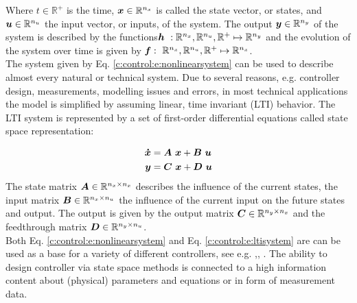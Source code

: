 Where $t \in \mathbb{R}^+$ is the time, $\mbox{\boldmath$x$} \in \mathbb{R}^{n_x}$ is called the state vector, or states, and $\mbox{\boldmath$u$} \in \mathbb{R}^{n_u}$ the input vector, or inputs, of the system. The output $\mbox{\boldmath$y$} \in \mathbb{R}^{n_y}$ of the system is described by the functions$\mbox{\boldmath$h$}~:\mathbb{R}^{n_x},\mathbb{R}^{n_u},\mathbb{R}^+ \mapsto \mathbb{R}^{n_y}$ and the evolution of the system over time is given by $\mbox{\boldmath$f$}:~\mathbb{R}^{n_x},\mathbb{R}^{n_u},\mathbb{R}^+ \mapsto \mathbb{R}^{n_x} $.\\

The system given by Eq. \ref{c:control:e:nonlinearsystem} can be used to describe almost every natural or technical system.\newline
Due to several reasons, e.g. controller design, measurements, modelling issues and errors, in most technical applications the model is simplified by assuming linear, time invariant (LTI) behavior. The LTI system is represented by a set of first-order differential equations \cite{Lunze2014} called state space representation:

\begin{align}
\begin{split}
\mbox{\boldmath$\dot{x}$} &= \mbox{\boldmath$A$}~\mbox{\boldmath$x$} + \mbox{\boldmath$B$}~\mbox{\boldmath$u$} \\
\mbox{\boldmath$y$} &= \mbox{\boldmath$C$}~\mbox{\boldmath$x$} + \mbox{\boldmath$D$}~\mbox{\boldmath$u$}
\end{split}
\label{c:control:e:ltisystem}
\end{align}
The state matrix $\mbox{\boldmath$A$} \in \mathbb{R}^{n_x\times n_x}$ describes the influence of the current states, the input matrix $\mbox{\boldmath$B$} \in \mathbb{R}^{n_x\times n_u}$ the influence of the current input on the future states and output. The output is given by the output matrix $\mbox{\boldmath$C$} \in \mathbb{R}^{n_y\times n_x}$ and the feedthrough matrix $\mbox{\boldmath$D$} \in \mathbb{R}^{n_y\times n_u}$.\\

Both Eq. \ref{c:control:e:nonlinearsystem} and Eq. \ref{c:control:e:ltisystem} are can be used as a base for a variety of different controllers, see e.g. \cite{Adamy2014},\cite{Lunze2014}, \cite{Lunze2016}. The ability to design controller via state space methods is connected to a high information content about (physical) parameters and equations or in form of measurement data.\\

